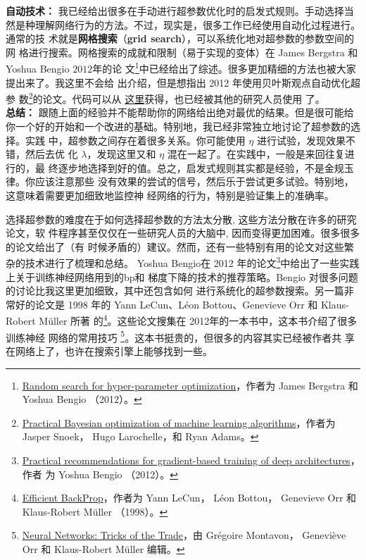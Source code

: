 \textbf{自动技术：} 我已经给出很多在手动进行超参数优化时的启发式规则。手动选择当
然是种理解网络行为的方法。不过，现实是，很多工作已经使用自动化过程进行。通常的技
术就是\textbf{网格搜索}（\textbf{grid search}），可以系统化地对超参数的参数空间的网
格进行搜索。网格搜索的成就和限制（易于实现的变体）在 James Bergstra 和 Yoshua
Bengio $2012$年的论
文\footnote{\href{http://dl.acm.org/citation.cfm?id=2188395}{Random search for
    hyper-parameter optimization}，作者为 James Bergstra 和 Yoshua Bengio
  （2012）。}中已经给出了综述。很多更加精细的方法也被大家提出来了。我这里不会给
出介绍，但是想指出 2012 年使用贝叶斯观点自动优化超参
数\footnote{\href{http://papers.nips.cc/paper/4522-practical-bayesian-optimization-of-machine-learning-algorithms.pdf}{Practical
    Bayesian optimization of machine learning algorithms}，作者为 Jasper Snoek，
  Hugo Larochelle，和 Ryan Adams。}的论文。代码可以从%
\href{https://github.com/jaberg/hyperopt}{这里}获得，也已经被其他的研究人员使用
了。\\

\textbf{总结：} 跟随上面的经验并不能帮助你的网络给出绝对最优的结果。但是很可能给
你一个好的开始和一个改进的基础。特别地，我已经非常独立地讨论了超参数的选择。实践
中，超参数之间存在着很多关系。你可能使用 $\eta$ 进行试验，发现效果不错，然后去优
化 $\lambda$，发现这里又和 $\eta$ 混在一起了。在实践中，一般是来回往复进行的，最
终逐步地选择到好的值。总之，启发式规则其实都是经验，不是金规玉律。你应该注意那些
没有效果的尝试的信号，然后乐于尝试更多试验。特别地，这意味着需要更加细致地监控神
经网络的行为，特别是验证集上的准确率。

选择超参数的难度在于如何选择超参数的方法太分散, 这些方法分散在许多的研究论文，软
件程序甚至仅仅在一些研究人员的大脑中, 因而变得更加困难。很多很多的论文给出了（有
时候矛盾的）建议。然而，还有一些特别有用的论文对这些繁杂的技术进行了梳理和总结。
Yoshua Bengio在 2012 年的论文\footnote{\href{http://arxiv.org/abs/1206.5533}{Practical
    recommendations for gradient-based training of deep architectures}，作者
  为 Yoshua Bengio （2012）。}中给出了一些实践上关于训练神经网络用到的\gls*{bp}和
梯度下降的技术的推荐策略。Bengio 对很多问题的讨论比我这里更加细致，其中还包含如何
进行系统化的超参数搜索。另一篇非常好的论文是 1998 年的 Yann LeCun、Léon
Bottou、Genevieve Orr 和 Klaus-Robert Müller 所著
的\footnote{\href{http://yann.lecun.com/exdb/publis/pdf/lecun-98b.pdf}{Efficient
    BackProp}，作者为 Yann LeCun， Léon Bottou， Genevieve Orr 和 Klaus-Robert
  Müller （1998）。}。这些论文搜集在 2012年的一本书中，这本书介绍了很多训练神经
网络的常用技巧
\footnote{\href{http://www.springer.com/computer/theoretical+computer+science/book/978-3-642-35288-1}{Neural
    Networks: Tricks of the Trade}，由 Grégoire Montavon， Geneviève
  Orr 和 Klaus-Robert Müller 编辑。}。这本书挺贵的，但很多的内容其实已经被作者共
享在网络上了，也许在搜索引擎上能够找到一些。


